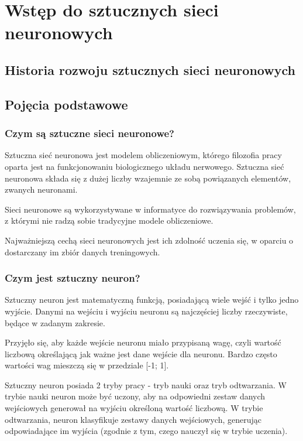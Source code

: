 \chapter{Wstęp do sztucznych sieci neuronowych}
\section{Historia rozwoju sztucznych sieci neuronowych}
\section{Pojęcia podstawowe}
\subsection{Czym są sztuczne sieci neuronowe?}
Sztuczna sieć neuronowa jest modelem obliczeniowym, którego filozofia pracy oparta jest na funkcjonowaniu biologicznego układu nerwowego.
Sztuczna sieć neuronowa składa się z dużej liczby wzajemnie ze sobą powiązanych elementów, zwanych neuronami.

Sieci neuronowe są wykorzystywane w informatyce do rozwiązywania problemów, z którymi nie radzą sobie tradycyjne modele obliczeniowe.

Najważniejszą cechą sieci neuronowych jest ich zdolność uczenia się, w oparciu o dostarczany im zbiór danych treningowych.

\subsection{Czym jest sztuczny neuron?}
Sztuczny neuron jest matematyczną funkcją, posiadającą wiele wejść i tylko jedno wyjście. Danymi na wejściu i wyjściu neuronu są najczęściej liczby rzeczywiste, będące  w zadanym zakresie.

Przyjęło się, aby każde wejście neuronu miało przypisaną wagę, czyli wartość liczbową określającą jak ważne jest dane wejście dla neuronu.
Bardzo często wartości wag mieszczą się w przedziale [-1; 1].

Sztuczny neuron posiada 2 tryby pracy - tryb nauki oraz tryb odtwarzania. \newline
W trybie nauki neuron może być uczony, aby na odpowiedni zestaw danych
wejściowych generował na wyjściu określoną wartość liczbową. \newline
W trybie odtwarzania, neuron klasyfikuje zestawy danych wejściowych, generując
odpowiadające im wyjścia (zgodnie z tym, czego nauczył się w trybie uczenia).


